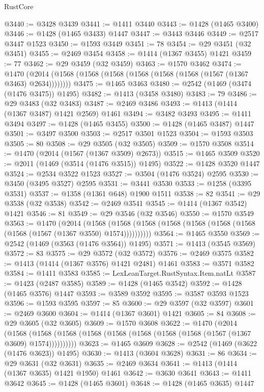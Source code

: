 \begin{lexlean}{RustCore}
\begin{coremodule}
{\begin{coremodule}
{{{{{{{{{{{{{{{{{{{{{{{{{{{{{{{{{{{{{{{{{{{{{{{@3440 := @3428 @3439
@3441 := @1411 @3440
@3443 := @1428 (@1465 @3400)
@3446 := @1428 (@1465 @3433) @1447
@3447 := @3443 @3446
@3449 := @2517 @3447 @1523
@3450 := @1593 @3449
@3451 := 78
@3454 := @29 @3451 (@32 @3451)
@3455 := @2469 @3454
@3458 := @1414 (@1367 @3455) @1421
@3459 := 77
@3462 := @29 @3459 (@32 @3459)
@3463 := @1570 @3462
@3474 := @1470 (@2014 (@1568 (@1568 (@1568 (@1568 (@1568 (@1568 (@1567 (@1367 @3463) @2634))))))))
@3475 := @1465 @3463
@3480 := @2542 (@1469 (@3474 (@1476 @3475)) @1495)
@3482 := @1413 (@3458 @3480)
@3483 := 79
@3486 := @29 @3483 (@32 @3483)
@3487 := @2469 @3486
@3493 := @1413 (@1414 (@1367 @3487) @1421 @2569) @1461
@3494 := @3482 @3493
@3495 := @1411 @3494
@3497 := @1428 (@1465 @3455)
@3500 := @1428 (@1465 @3487) @1447
@3501 := @3497 @3500
@3503 := @2517 @3501 @1523
@3504 := @1593 @3503
@3505 := 80
@3508 := @29 @3505 (@32 @3505)
@3509 := @1570 @3508
@3514 := @1470 (@2014 (@1567 (@1367 @3509) @2673))
@3515 := @1465 @3509
@3520 := @2011 (@1469 (@3514 (@1476 @3515)) @1495)
@3522 := @1428 @3520 @1447
@3524 := @2534 @3522 @1523
@3527 := @3504 (@1476 @3524) @2595
@3530 := @3450 (@3495 @3527) @2595
@3531 := @3441 @3530
@3533 := @1258 (@3395 @3531)
@3537 := @1358 (@1361 @648) @1900 @1511
@3538 := 82
@3541 := @29 @3538 (@32 @3538)
@3542 := @2469 @3541
@3545 := @1414 (@1367 @3542) @1421
@3546 := 81
@3549 := @29 @3546 (@32 @3546)
@3550 := @1570 @3549
@3563 := @1470
    (@2014
      (@1568 (@1568 (@1568 (@1568 (@1568 (@1568 (@1568 (@1568 (@1567 (@1367 @3550) @1574))))))))))
@3564 := @1465 @3550
@3569 := @2542 (@1469 (@3563 (@1476 @3564)) @1495)
@3571 := @1413 (@3545 @3569)
@3572 := 83
@3575 := @29 @3572 (@32 @3572)
@3576 := @2469 @3575
@3582 := @1413 (@1414 (@1367 @3576) @1421 @2481) @1461
@3583 := @3571 @3582
@3584 := @1411 @3583
@3585 := LexLeanTarget.RustSyntax.Item.natLt
@3587 := @1423 (@2487 @3585)
@3589 := @1428 (@1465 @3542)
@3592 := @1428 (@1465 @3576) @1447
@3593 := @3589 @3592
@3595 := @3587 @3593 @1523
@3596 := @1593 @3595
@3597 := 85
@3600 := @29 @3597 (@32 @3597)
@3601 := @2469 @3600
@3604 := @1414 (@1367 @3601) @1421
@3605 := 84
@3608 := @29 @3605 (@32 @3605)
@3609 := @1570 @3608
@3622 := @1470
    (@2014
      (@1568 (@1568 (@1568 (@1568 (@1568 (@1568 (@1568 (@1568 (@1567 (@1367 @3609) @1574))))))))))
@3623 := @1465 @3609
@3628 := @2542 (@1469 (@3622 (@1476 @3623)) @1495)
@3630 := @1413 (@3604 @3628)
@3631 := 86
@3634 := @29 @3631 (@32 @3631)
@3635 := @2469 @3634
@3641 := @1413 (@1414 (@1367 @3635) @1421 @1950) @1461
@3642 := @3630 @3641
@3643 := @1411 @3642
@3645 := @1428 (@1465 @3601)
@3648 := @1428 (@1465 @3635) @1447
}}}}}}}}}}}}}}}}}}}}}}}}}}}}}}}}}}}}}}}}}}}}}}}
\end{coremodule}}
\end{coremodule}
\end{lexlean}
